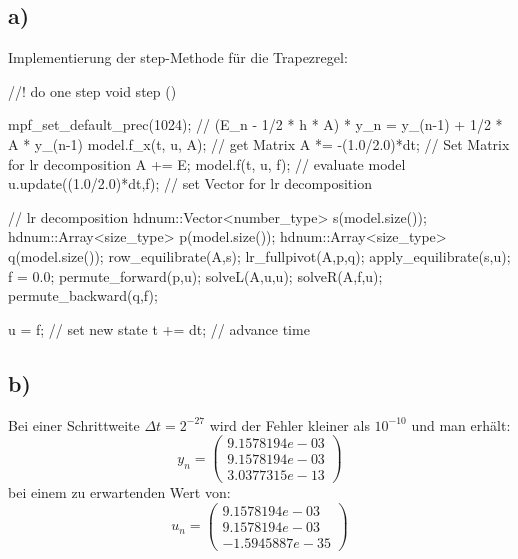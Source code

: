 \documentclass[10pt,oneside,a4paper]{scrartcl}
\begin{document}
    \subsection*{a)}
    Implementierung der step-Methode für die Trapezregel:\\
    \begin{cppcode}
    //! do one step
    void step ()
    {
      mpf_set_default_prec(1024);
      // (E_n - 1/2 * h * A) * y_n = y_(n-1) + 1/2 * A * y_(n-1)
      model.f_x(t, u, A);         // get Matrix
      A *= -(1.0/2.0)*dt;         // Set Matrix for lr decomposition
      A += E;
      model.f(t, u, f);           // evaluate model
      u.update((1.0/2.0)*dt,f);   // set Vector for lr decomposition

      // lr decomposition
      hdnum::Vector<number_type> s(model.size());
      hdnum::Array<size_type> p(model.size());
      hdnum::Array<size_type> q(model.size());
      row_equilibrate(A,s);
      lr_fullpivot(A,p,q);
      apply_equilibrate(s,u);
      f = 0.0;
      permute_forward(p,u);
      solveL(A,u,u);
      solveR(A,f,u);
      permute_backward(q,f);

      u = f;            // set new state
      t += dt;          // advance time
    }
    \end{cppcode}
    
    \subsection*{b)}
    Bei einer Schrittweite $\Delta t = 2^{-27}$ wird der Fehler kleiner als
    $10^{-10}$ und man erhält:\\
    \begin{equation*}
        y_n =    
        \begin{pmatrix}
            9.1578194e-03\\
            9.1578194e-03\\
            3.0377315e-13
        \end{pmatrix}
    \end{equation*}
    bei einem zu erwartenden Wert von:\\
        \begin{equation*}
        u_n =    
        \begin{pmatrix}
            9.1578194e-03\\
            9.1578194e-03\\
            -1.5945887e-35
        \end{pmatrix}
    \end{equation*}
\end{document}
